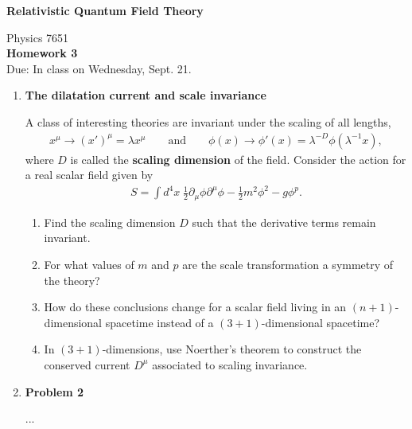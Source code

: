 \documentclass[12pt]{article}
\begin{document}
\vspace*{-1cm}
\begin{center}
{\LARGE \bf Relativistic Quantum Field Theory}

\vspace*{0.5cm}
{\Large Physics 7651} \\
\vspace*{0.5cm}
{\Large {\bf Homework 3}\\
\vspace*{0.5cm}
Due: In class on Wednesday, Sept. 21.}
\end{center}
\begin{enumerate}

\item  {\bf The dilatation current and scale invariance} 

A class of interesting theories are invariant under the scaling of all lengths,
\begin{align*}
	x^\mu \to (x')^\mu = \lambda x^\mu
	\qquad
	\text{and}  
	\qquad
	\phi(x) \to \phi'(x) = \lambda^{-D}\phi(\lambda^{-1}x),
\end{align*}
where $D$ is called the \textbf{scaling dimension} of the field. Consider the action for a real scalar field given by
\begin{align*}
	S = \int d^4x \; \frac 12 \partial_\mu\phi\partial^\mu\phi - \frac 12 m^2\phi^2 - g\phi^p.
\end{align*}

\begin{enumerate}
	\item Find the scaling dimension $D$ such that the derivative terms remain invariant. 
	\item For what values of $m$ and $p$ are the scale transformation a symmetry of the theory?
	\item How do these conclusions change for a scalar field living in an $(n+1)$-dimensional spacetime instead of a $(3+1)$-dimensional spacetime?
	\item In $(3+1)$-dimensions, use Noerther's theorem to construct the conserved current $D^\mu$ associated to scaling invariance. 
\end{enumerate}


 \vspace*{0.5cm}

\item {\bf Problem 2}

...
 
\end{enumerate}
\end{document}
